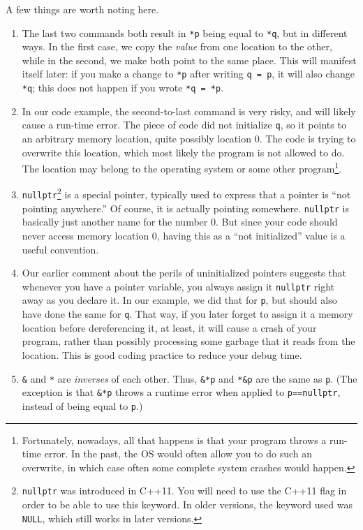 A few things are worth noting here.
\begin{enumerate}
\item The last two commands both result in \texttt{*p} being equal to
\texttt{*q}, but in different ways. In the first case, we copy the
\emph{value} from one location to the other, while in the second, 
we make both point to the same place.
This will manifest itself later: if you make a change to \texttt{*p}
after writing \texttt{q = p}, it will also change \texttt{*q};
this does not happen if you wrote \texttt{*q = *p}.
\item In our code example, the second-to-last command is very risky,
  and will likely cause a run-time error.
  The piece of code did not initialize \texttt{q},
  so it points to an arbitrary memory location, quite possibly location 0.
  The code is trying to overwrite this location,
  which most likely the program is not allowed to do.
  The location may belong to the operating system or
  some other program\footnote{Fortunately, nowadays, all that happens
    is that your program throws a run-time error. In the past, the OS
    would often allow you to do such an overwrite, in which case often
    some complete system crashes would happen.}.
\item \texttt{nullptr}\footnote{\texttt{nullptr} was introduced in
    C++11. You will need to use the C++11 flag in order to be able to
    use this keyword. In older versions, the keyword used was
    \texttt{NULL}, which still works in later versions.} is a special
  pointer, typically used to express that a pointer is ``not pointing
  anywhere.'' Of course, it is actually pointing somewhere.
  \texttt{nullptr} is basically just another name for the number 0.
  But since your code should never access memory location 0,
  having this as a ``not initialized'' value is a useful convention.
\item Our earlier comment about the perils of
  uninitialized pointers suggests that whenever you have a pointer
  variable, you always assign it \texttt{nullptr} right away as you declare
  it. In our example, we did that for \texttt{p}, but should also have
  done the same for \texttt{q}.
  That way, if you later forget to assign it a memory location before
  dereferencing it, at least, it will cause a crash of your program,
  rather than possibly processing some garbage that it reads from the
  location.
  This is good coding practice to reduce your debug time.
\item \texttt{\&} and \texttt{*} are \emph{inverses} of each other.
  Thus, \texttt{\&*p} and \texttt{*\&p} are the same as \texttt{p}.
  (The exception is that \texttt{\&*p} throws a runtime error when applied
  to \texttt{p==nullptr}, instead of being equal to \texttt{p}.)
\end{enumerate}

